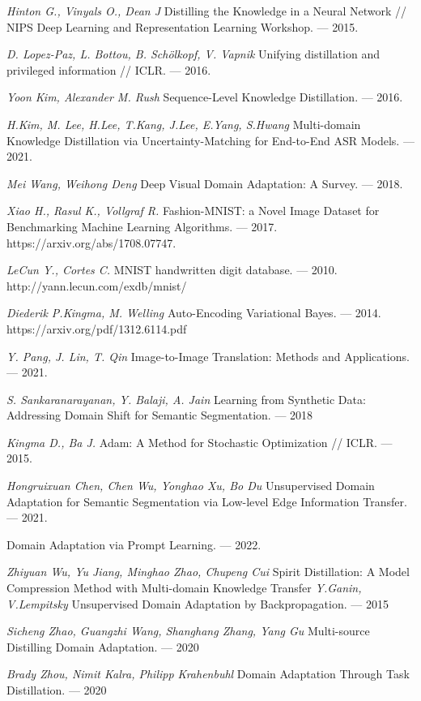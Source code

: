 \newpage


\begin{thebibliography}{99}
	\textit{Hinton G., Vinyals O., Dean J} Distilling the Knowledge in a Neural Network // NIPS Deep Learning and Representation Learning Workshop. — 2015.
    
    \textit{D. Lopez-Paz, L. Bottou, B. Schölkopf, V. Vapnik} Unifying distillation and privileged information // ICLR. — 2016.
	
	\textit{Yoon Kim, Alexander M. Rush} Sequence-Level Knowledge Distillation. — 2016.
	
	\textit{H.Kim, M. Lee, H.Lee, T.Kang, J.Lee, E.Yang, S.Hwang} Multi-domain Knowledge Distillation via Uncertainty-Matching for End-to-End ASR Models. — 2021.
	
	\textit{Mei Wang, Weihong Deng} Deep Visual Domain Adaptation: A Survey. — 2018.
	
    \textit{Xiao H., Rasul K., Vollgraf R.} Fashion-MNIST: a Novel Image Dataset for
    Benchmarking Machine Learning Algorithms. — 2017. https://arxiv.org/abs/1708.07747.
    
    \textit{LeCun Y., Cortes C.} MNIST handwritten digit database. --- 2010. http://yann.lecun.com/exdb/mnist/
    
    \textit{Diederik P.Kingma, M. Welling} Auto-Encoding Variational Bayes. --- 2014. https://arxiv.org/pdf/1312.6114.pdf
    
    \textit{Y. Pang, J. Lin, T. Qin} Image-to-Image Translation: Methods and 
    Applications. --- 2021.
    
    \textit{S. Sankaranarayanan, Y. Balaji, A. Jain} Learning from Synthetic Data: Addressing Domain Shift for Semantic Segmentation. --- 2018
    
    \textit{Kingma D., Ba J.} Adam: A Method for Stochastic Optimization // ICLR. — 2015.
    
    \textit{Hongruixuan Chen, Chen Wu, Yonghao Xu, Bo Du} Unsupervised Domain Adaptation for Semantic Segmentation via Low-level Edge Information Transfer. --- 2021.
    
     Domain Adaptation via Prompt Learning. --- 2022.
    
    \textit{Zhiyuan Wu, Yu Jiang,  Minghao Zhao, Chupeng Cui} Spirit Distillation: A Model Compression Method with Multi-domain Knowledge Transfer
    \textit{Y.Ganin, V.Lempitsky} Unsupervised Domain Adaptation by Backpropagation. --- 2015
    
    \textit{Sicheng Zhao, Guangzhi Wang, Shanghang Zhang, Yang Gu} Multi-source Distilling Domain Adaptation. --- 2020
    
    \textit{Brady Zhou, Nimit Kalra,  Philipp Krahenbuhl} Domain Adaptation Through Task Distillation. --- 2020

	
\end{thebibliography}
